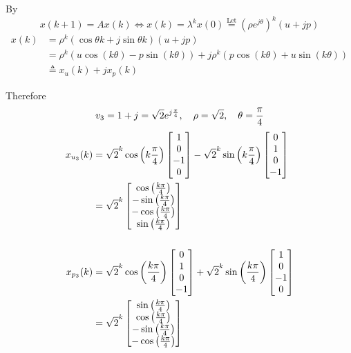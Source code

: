 \documentclass[12pt,a4paper]{article}
\begin{document}
By
\[
x(k + 1) = Ax(k) \Leftrightarrow x(k) = \lambda^k x(0) \overset{\text{Let}}{=} (\rho e^{j\theta})^k (u + jp)
\]
\begin{align*}
	x(k) &= \rho^k (\cos \theta k + j\sin \theta k) (u + jp) \\
	&= \rho^k (u\cos (k\theta) - p\sin (k\theta)) + j\rho^k( p\cos(k\theta) + u\sin (k\theta)) \\
	&\triangleq x_u(k) + jx_p(k)
\end{align*}

Therefore
\[
v_3 = 1 + j = \sqrt2 e^{j {\pi\over4}}, \quad \rho = \sqrt2, \quad\theta = {\pi\over4}
\]
\begin{align*}
	x_{u_3}(k) &= \sqrt2^k \cos \left(k{\pi\over4}\right) \begin{bmatrix}
		1 \\ 0 \\ -1 \\ 0
	\end{bmatrix} - \sqrt2^k \sin \left(k{\pi\over4}\right)\begin{bmatrix}
	0 \\ 1 \\ 0 \\ -1
	\end{bmatrix} \\
	&= \sqrt2^k \begin{bmatrix}
	\cos \left({k\pi\over4}\right) \\
	-\sin \left({k\pi\over4}\right) \\
	-\cos \left({k\pi\over4}\right) \\
	\sin \left({k\pi\over4}\right)
	\end{bmatrix} \\ \\ 
	x_{p_3}(k) &= \sqrt2^k \cos \left({k\pi\over4}\right)\begin{bmatrix}
		0 \\ 1 \\ 0 \\ -1
	\end{bmatrix} + \sqrt2^k \sin\left({k\pi\over4}\right)\begin{bmatrix}
	1 \\ 0 \\ -1 \\ 0
	\end{bmatrix} \\
	&= \sqrt2^k \begin{bmatrix}
		\sin\left({k\pi\over4}\right) \\
		\cos \left({k\pi\over4}\right) \\
		-\sin \left({k\pi\over4}\right) \\
		-\cos \left({k\pi\over4}\right)
	\end{bmatrix}
\end{align*}
\end{document}
